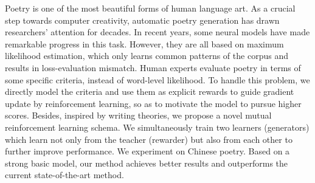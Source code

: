 Poetry is one of the most beautiful forms of human language art. As a crucial step towards computer creativity, automatic poetry generation has drawn researchers' attention for decades. In recent years, some neural models have made remarkable progress in this task. However, they are all based on maximum likelihood estimation, which only learns common patterns of the corpus and results in loss-evaluation mismatch. Human experts evaluate poetry in terms of some specific criteria, instead of word-level likelihood. To handle this problem, we directly model the criteria and use them as explicit rewards to guide gradient update by reinforcement learning, so as to motivate the model to pursue higher scores. Besides, inspired by writing theories, we propose a novel mutual reinforcement learning schema. We simultaneously train two learners (generators) which learn not only from the teacher (rewarder) but also from each other to further improve performance. We experiment on Chinese poetry. Based on a strong basic model, our method achieves better results and outperforms the current state-of-the-art method.
